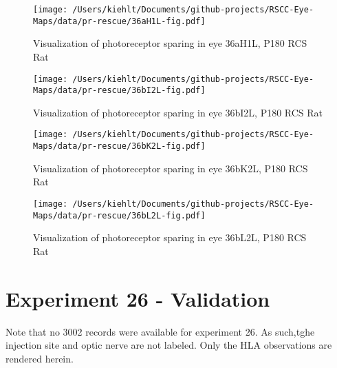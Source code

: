 \documentclass{article}
\begin{document}
\begin{center}
\begin{figure}
\texttt{[image: /Users/kiehlt/Documents/github-projects/RSCC-Eye-Maps/data/pr-rescue/36aH1L-fig.pdf]}
\caption{Visualization of photoreceptor sparing in eye 36aH1L, P180 RCS Rat}
\label{fig:36aH1L}
\end{figure}

\end{center}
\begin{center}
\begin{figure}
\texttt{[image: /Users/kiehlt/Documents/github-projects/RSCC-Eye-Maps/data/pr-rescue/36bI2L-fig.pdf]}
\caption{Visualization of photoreceptor sparing in eye 36bI2L, P180 RCS Rat}
\label{fig:36bI2L}
\end{figure}

\end{center}
\begin{center}
\begin{figure}
\texttt{[image: /Users/kiehlt/Documents/github-projects/RSCC-Eye-Maps/data/pr-rescue/36bK2L-fig.pdf]}
\caption{Visualization of photoreceptor sparing in eye 36bK2L, P180 RCS Rat}
\label{fig:36bK2L}
\end{figure}

\end{center}
\begin{center}
\begin{figure}
\texttt{[image: /Users/kiehlt/Documents/github-projects/RSCC-Eye-Maps/data/pr-rescue/36bL2L-fig.pdf]}
\caption{Visualization of photoreceptor sparing in eye 36bL2L, P180 RCS Rat}
\label{fig:36bL2L}
\end{figure}

\end{center}\newpage

\section{Experiment 26 - Validation}
Note that no 3002 records were available for experiment 26. As such,tghe injection site and optic nerve are not labeled. Only the HLA observations are rendered herein.
\end{document}
